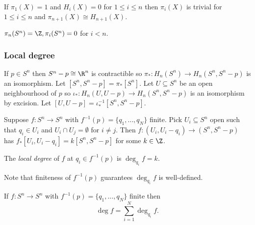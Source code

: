 \documentclass[a4paper]{article}
\begin{document}
\begin{corollary}
  If \(\pi_1(X) = 1\) and \(H_i(X) = 0\) for \(1 \leq i \leq n\) then \(\pi_i(X)\) is trivial for \(1 \leq i \leq n\) and \(\pi_{n + 1}(X) \cong H_{n + 1}(X)\).
\end{corollary}

\begin{corollary}
  \(\pi_n(S^n) = \Z, \pi_i(S^n) = 0\) for \(i < n\).
\end{corollary}

\subsubsection{Local degree}

If \(p \in S^n\) then \(S^n - p \cong \R^n\) is contractible so \(\pi_*: H_n(S^n) \to H_n(S^n, S^n - p)\) is an isomorphism. Let \([S^n, S^n - p] = \pi_*[S^n]\). Let \(U \subseteq S^n\) be an open neighbourhood of \(p\) so \(\iota_*: H_n(U, U - p) \to H_n(S^n, S^n - p)\) is an isomorphism by excision. Let \([U, U - p] = \iota_*^{-1}[S^n, S^n - p]\).

Suppose \(f: S^n \to S^n\) with \(f^{-1}(p) = \{q_1, \dots, q_N\}\) finite. Pick \(U_i \subseteq S^n\) open such that \(q_i \in U_i\) and \(U_i \cap U_j = \emptyset\) for \(i \neq j\). Then \(f: (U_i, U_i - q_i) \to (S^n, S^n - p)\) has \(f_*[U_i, U_i - q_i] = k[S^n, S^n - p]\) for some \(k \in \Z\).

\begin{definition}
  The \emph{local degree} of \(f\) at \(q_i \in f^{-1}(p)\) is \(\deg_{q_i} f = k\).
\end{definition}
Note that finiteness of \(f^{-1}(p)\) guarantees \(\deg_{q_i}f\) is well-defined.

\begin{theorem}
  If \(f: S^n \to S^n\) with \(f^{-1}(p) = \{q_1, \dots, q_N\}\) finite then
  \[
    \deg f = \sum_{i = 1}^N \deg_{q_i} f.
  \]
\end{theorem}
\end{document}
